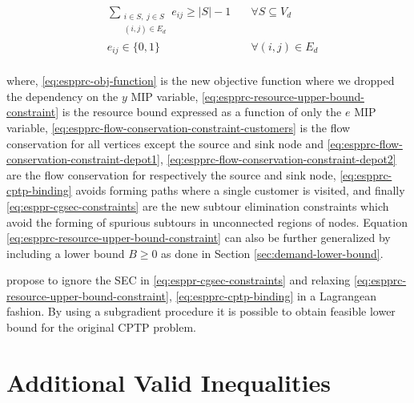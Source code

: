\begin{align}
	                                & \sum_{\substack{i \in S,\ j \in S                                                                                                                                                          \\ (i, j) \in E_d}} e_{ij} \ge |S| - 1                                                                   & \quad \forall S \subseteq V_d \label{eq:esppr-cgsec-constraints} \\
	                                & e_{ij}                   \in \lbrace 0, 1 \rbrace                                                          & \quad \forall (i, j) \in E_d               \label{eq:espprc-e-mip-var-bounds} \\
\end{align}

where, \eqref{eq:espprc-obj-function} is the new objective function where we dropped the dependency on the $y$ MIP variable,
\eqref{eq:espprc-resource-upper-bound-constraint} is the resource bound expressed as a function of only the $e$ MIP variable,
\eqref{eq:espprc-flow-conservation-constraint-customers} is the flow conservation for all vertices except the source and sink node
and \eqref{eq:espprc-flow-conservation-constraint-depot1}, \eqref{eq:espprc-flow-conservation-constraint-depot2} are the flow conservation for respectively the source and sink node,
\eqref{eq:espprc-cptp-binding} avoids forming paths where a single customer is visited,
and finally \eqref{eq:esppr-cgsec-constraints} are the new subtour elimination constraints which avoid the forming of spurious subtours in unconnected regions of nodes.
Equation \eqref{eq:espprc-resource-upper-bound-constraint} can also be further generalized by including a lower bound $B \ge 0$ as done in Section \ref{sec:demand-lower-bound}.

\cite{beasley1989algorithm} propose to ignore the SEC in \eqref{eq:esppr-cgsec-constraints} and relaxing \eqref{eq:espprc-resource-upper-bound-constraint}, \eqref{eq:espprc-cptp-binding} in a Lagrangean fashion.
By using a subgradient procedure it is possible to obtain feasible lower bound for the original CPTP problem.






\section{Additional Valid Inequalities}\label{sec:additional-valid-inequalities}

